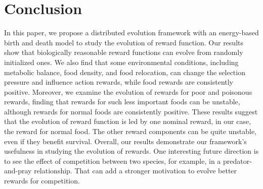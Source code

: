 \section{Conclusion}
In this paper, we propose a distributed evolution framework with an energy-based birth and death model to study the evolution of reward function. Our results show that biologically reasonable reward functions can evolve from randomly initialized ones. We also find that some environmental conditions, including metabolic balance, food density, and food relocation, can change the selection pressure and influence action rewards, while food rewards are consistently positive. Moreover, we examine the evolution of rewards for poor and poisonous rewards, finding that rewards for such less important foods can be unstable, although rewards for normal foods are consistently positive. These results suggest that the evolution of reward function is led by one nominal reward, in our case, the reward for normal food. The other reward components can be quite unstable, even if they benefit survival. Overall, our results demonstrate our framework's usefulness in studying the evolution of rewards. One interesting future direction is to see the effect of competition between two species, for example, in a predator-and-pray relationship. That can add a stronger motivation to evolve better rewards for competition.
